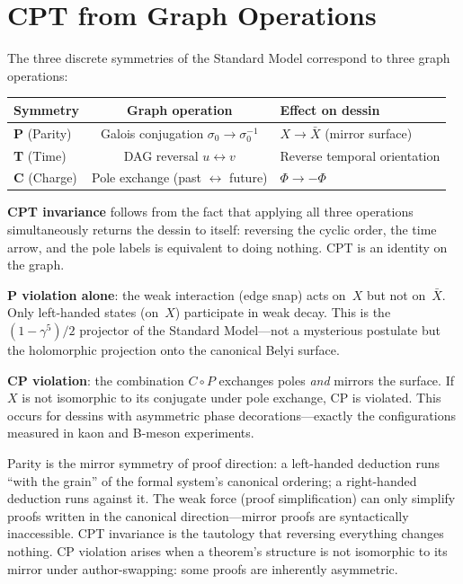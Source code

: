 \documentclass[11pt, a4paper, openany]{book}
\begin{document}
\section{CPT from Graph Operations}\label{sec:cpt}

The three discrete symmetries of the Standard Model correspond to three
graph operations:

\begin{center}\small
\begin{tabular}{@{}lcl@{}}
\toprule
\textbf{Symmetry} & \textbf{Graph operation} & \textbf{Effect on dessin} \\
\midrule
\textbf{P} (Parity) & Galois conjugation $\sigma_0 \to \sigma_0^{-1}$
  & $X \to \bar{X}$ (mirror surface) \\
\textbf{T} (Time) & DAG reversal $u \leftrightarrow v$
  & Reverse temporal orientation \\
\textbf{C} (Charge) & Pole exchange (past $\leftrightarrow$ future)
  & $\Phi \to -\Phi$ \\
\bottomrule
\end{tabular}
\end{center}

\noindent
\textbf{CPT invariance} follows from the fact that applying all three
operations simultaneously returns the dessin to itself: reversing the
cyclic order, the time arrow, and the pole labels is equivalent to
doing nothing. CPT is an identity on the graph.

\textbf{P violation alone}: the weak interaction (edge snap) acts on~$X$
but not on~$\bar{X}$. Only left-handed states (on~$X$) participate in
weak decay. This is the $(1 - \gamma^5)/2$ projector of the Standard
Model---not a mysterious postulate but the holomorphic projection
onto the canonical Belyi surface.

\textbf{CP violation}: the combination $C \circ P$ exchanges poles
\emph{and} mirrors the surface. If $X$ is not isomorphic to its
conjugate under pole exchange, CP is violated. This occurs for dessins
with asymmetric phase decorations---exactly the configurations measured
in kaon and B-meson experiments.

\begin{logicalreading}
Parity is the mirror symmetry of proof direction: a left-handed
deduction runs ``with the grain'' of the formal system's canonical
ordering; a right-handed deduction runs against it. The weak force
(proof simplification) can only simplify proofs written in the
canonical direction---mirror proofs are syntactically inaccessible.
CPT invariance is the tautology that reversing everything changes
nothing. CP violation arises when a theorem's structure is not
isomorphic to its mirror under author-swapping: some proofs are
inherently asymmetric.
\end{logicalreading}
\end{document}
